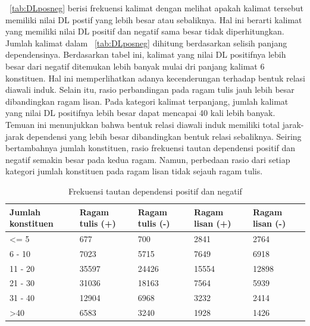 \tab~\ref{tab:DLposneg} berisi frekuensi kalimat dengan melihat apakah kalimat tersebut memiliki nilai DL postif yang lebih besar atau sebaliknya. Hal ini berarti kalimat yang memiliki nilai DL positif dan negatif sama besar tidak diperhitungkan. Jumlah kalimat dalam \tab~\ref{tab:DLposneg} dihitung berdasarkan selisih panjang dependensinya. Berdasarkan tabel ini, kalimat yang nilai DL positifnya lebih besar dari negatif ditemukan lebih banyak mulai dri panjang kalimat 6 konstituen. Hal ini memperlihatkan adanya kecenderungan terhadap bentuk relasi diawali induk. Selain itu, rasio perbandingan pada ragam tulis jauh lebih besar dibandingkan ragam lisan. Pada kategori kalimat terpanjang, jumlah kalimat yang nilai DL positifnya lebih besar dapat mencapai 40 kali lebih banyak.  Temuan ini menunjukkan bahwa bentuk relasi diawali induk memiliki total jarak-jarak dependensi yang lebih besar dibandingkan bentuk relasi sebaliknya. Seiring bertambahnya jumlah konstituen, rasio frekuensi tautan dependensi positif dan negatif semakin besar pada kedua ragam. Namun, perbedaan rasio dari setiap kategori jumlah konstituen pada ragam lisan tidak sejauh ragam tulis. 

\begin{table}
\begin{center}
\begin{small}
\caption{Frekuensi tautan dependensi positif dan negatif}  \label{tab:tautanposneg}
\begin{tabular}{ | p{2cm} | p{2cm} | p{2cm} | p{2cm} | p{2cm} |}
    \hline
Jumlah konstituen & Ragam tulis (+) & Ragam tulis (-) & Ragam lisan (+) & Ragam lisan (-) \\ \hline
\textless= 5 & 677 & 700 & 2841 & 2764 \\ \hline
6 - 10 & 7023 & 5715 & 7649 & 6918 \\ \hline
11 - 20 & 35597 & 24426 & 15554 & 12898 \\ \hline
21 - 30 & 31036 & 18163 & 7564 & 5939 \\ \hline
31 - 40 & 12904 & 6968 & 3232 & 2414 \\ \hline
\textgreater 40 & 6583 & 3240 & 1928 & 1426 \\ \hline
   \end{tabular}
   \end{small}
\end{center}
\end{table}

